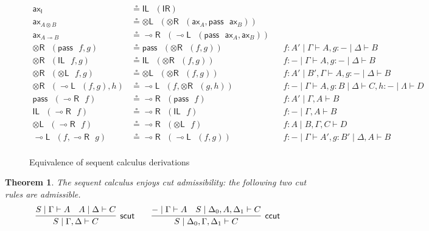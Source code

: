 \documentclass[copyright,creativecommons]{eptcs}
\newtheorem{theorem}{Theorem}[section]
\theoremstyle{definition}
\newcommand{\tl}{\otimes \mathsf{L}}
\newcommand{\tr}{\otimes \mathsf{R}}
\newcommand{\lright}{{\multimap}\mathsf{R}}
\newcommand{\lleft}{{\multimap}\mathsf{L}}
\newcommand{\pass}{\mathsf{pass}}
\newcommand{\unitl}{\mathsf{IL}}
\newcommand{\unitr}{\mathsf{IR}}
\newcommand{\ax}{\mathsf{ax}}
\newcommand{\ot}{\otimes}
\newcommand{\lolli}{\multimap}
\newcommand{\I}{\mathsf{I}}
\newcommand{\niccolo}[1]{{\color{red}\textbf{Niccol{\`o}: }#1}}
\begin{document}
\begin{figure}[t!]\small
\begin{align*}
  \ax_{\I} &\circeq \unitl \text{ } (\unitr)
  \\
  \ax_{A \ot B} &\circeq \tl \text{ } (\tr \text{ } (\ax_{A} , \pass \text{ } \ax_{B}))
  \\
  \ax_{A \lolli B} &\circeq \lright \text{ } (\lleft \text{ } (\pass \text{ } \ax_{A}, \ax_{B} ))
  \\
  \tr \text{ } (\pass \text{ } f, g) &\circeq \pass \text{ } (\tr \text{ } (f, g)) &&f : A' \mid \Gamma \vdash A, g : {-} \mid \Delta \vdash B
  \\
  \tr \text{ } (\unitl \text{ } f, g) &\circeq \unitl \text{ } (\tr \text{ } (f , g)) &&f : {-} \mid \Gamma \vdash A , g : {-} \mid \Delta \vdash B
  \\
  \tr \text{ } (\tl \text{ } f, g) &\circeq \tl \text{ } (\tr \text{ } (f , g)) &&f : A' \mid B' , \Gamma \vdash A , g : {-} \mid \Delta \vdash B
  \\
  \tr \text{ } (\lleft \text{ } (f , g), h) & \circeq \lleft \text{ } (f, \tr \text{ } (g, h)) &&f: {-} \mid \Gamma \vdash A, g : B \mid \Delta \vdash C, h : {-} \mid \Lambda \vdash D
  \\
  \pass \text{ } (\lright \text{ } f) &\circeq \lright \text{ } (\pass \text{ } f) &&f : A' \mid \Gamma , A \vdash B
  \\
  \unitl \text{ } (\lright \text{ } f) &\circeq \lright \text{ } (\unitl \text{ } f) &&f : {-} \mid \Gamma , A \vdash B
  \\
  \tl \text{ } (\lright \text{ } f) &\circeq \lright \text{ } (\tl \text{ } f) &&f : A \mid B , \Gamma , C \vdash D
  \\
  \lleft \text{ } (f, \lright \text{ } g) &\circeq \lright \text{ } (\lleft \text{ } (f, g)) &&f : {-} \mid \Gamma \vdash A', g : B' \mid \Delta , A \vdash B
  \\
\end{align*}
\vspace{-1.5cm}
\caption{Equivalence of sequent calculus derivations}
\label{fig:circeq}
\end{figure}
\begin{theorem}
The sequent calculus enjoys cut admissibility: the following two cut rules are admissible.
  \begin{displaymath}
    \infer[\mathsf{scut}]{S \mid \Gamma , \Delta \vdash C}{
      S \mid \Gamma \vdash A
      &
      A \mid \Delta \vdash C
    }
    \qquad
    \infer[\mathsf{ccut}]{S \mid \Delta_0 , \Gamma , \Delta_1 \vdash C}{
      {-} \mid \Gamma \vdash A
      &
      S \mid \Delta_0 , A , \Delta_1 \vdash C
    }
  \end{displaymath}
\end{theorem}
\end{document}
